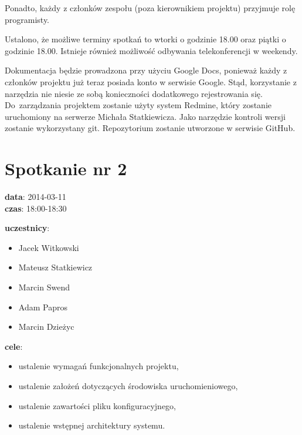 \vspace{5mm}
Ponadto, każdy z członków zespołu (poza kierownikiem projektu) przyjmuje rolę
programisty.

\vspace{5mm}
Ustalono, że możliwe terminy spotkań to wtorki o godzinie 18.00 oraz piątki
o godzinie 18.00. Istnieje również możliwość odbywania telekonferencji
w weekendy.

\vspace{5mm}
Dokumentacja będzie prowadzona przy użyciu Google Docs, ponieważ każdy
z członków projektu już teraz posiada konto w serwisie Google. Stąd, korzystanie
z narzędzia nie niesie ze sobą konieczności dodatkowego rejestrowania się.
Do~zarządzania projektem zostanie użyty system Redmine, który zostanie
uruchomiony na serwerze Michała Statkiewicza. Jako narzędzie kontroli wersji
zostanie wykorzystany git. Repozytorium zostanie utworzone w serwisie GitHub.

\section[Spotkanie nr 2][Spotkanie nr 2]{Spotkanie nr 2}

\noindent
\textbf{data}: 2014-03-11 \\
\textbf{czas}: 18:00-18:30

\vspace{5mm}
\noindent
\textbf{uczestnicy}:
\begin{itemize}
	\item Jacek Witkowski
	\item Mateusz Statkiewicz
	\item Marcin Swend
	\item Adam Papros
	\item Marcin Dzieżyc
\end{itemize}

\vspace{5mm}
\noindent
\textbf{cele}:
\begin{itemize}
  \item ustalenie wymagań funkcjonalnych projektu,
  \item ustalenie założeń dotyczących środowiska uruchomieniowego,
  \item ustalenie zawartości pliku konfiguracyjnego,
  \item ustalenie wstępnej architektury systemu.
\end{itemize}

